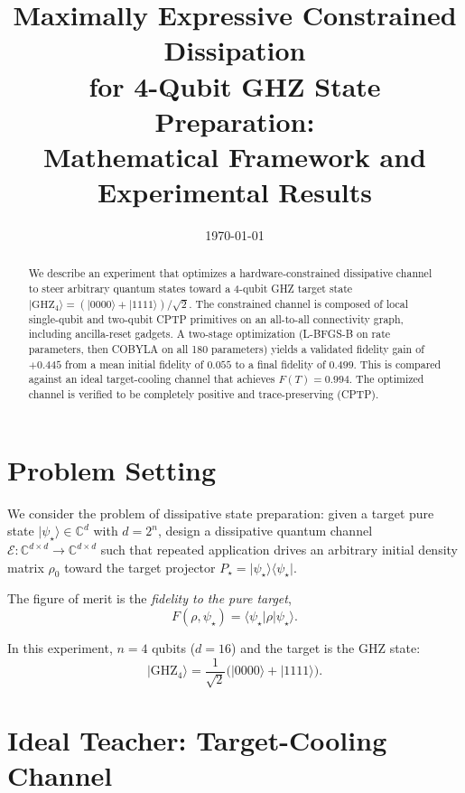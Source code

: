 \documentclass[11pt,a4paper]{article}
\title{Maximally Expressive Constrained Dissipation\\
  for 4-Qubit GHZ State Preparation:\\
  Mathematical Framework and Experimental Results}
\author{}
\date{\today}
\newcommand{\ket}[1]{\lvert #1 \rangle}
\newcommand{\bra}[1]{\langle #1 \rvert}
\newcommand{\C}{\mathbb{C}}
\begin{document}
\maketitle

\begin{abstract}
We describe an experiment that optimizes a hardware-constrained
dissipative channel to steer arbitrary quantum states toward a 4-qubit
GHZ target state $\ket{\mathrm{GHZ}_4} = (\ket{0000}+\ket{1111})/\sqrt{2}$.
The constrained channel is composed of local single-qubit and two-qubit
CPTP primitives on an all-to-all connectivity graph, including ancilla-reset
gadgets.  A two-stage optimization (L-BFGS-B on rate parameters, then
COBYLA on all 180 parameters) yields a validated fidelity gain of
$+0.445$ from a mean initial fidelity of $0.055$ to a final fidelity
of $0.499$.  This is compared against an ideal target-cooling channel
that achieves $F(T)=0.994$.  The optimized channel is verified to be
completely positive and trace-preserving (CPTP).
\end{abstract}

\section{Problem Setting}

We consider the problem of dissipative state preparation:
given a target pure state $\ket{\psi_\star}\in\C^{d}$ with
$d=2^n$, design a dissipative quantum channel
$\mathcal{E}:\C^{d\times d}\to\C^{d\times d}$ such that
repeated application drives an arbitrary initial density matrix
$\rho_0$ toward the target projector
$P_\star = \ket{\psi_\star}\bra{\psi_\star}$.

The figure of merit is the \emph{fidelity to the pure target},
\begin{equation}\label{eq:fidelity}
  F(\rho,\psi_\star) = \bra{\psi_\star}\rho\ket{\psi_\star}.
\end{equation}

In this experiment, $n=4$ qubits ($d=16$) and the target is the
GHZ state:
\begin{equation}
  \ket{\mathrm{GHZ}_4}
  = \frac{1}{\sqrt{2}}\bigl(\ket{0000}+\ket{1111}\bigr).
\end{equation}

\section{Ideal Teacher: Target-Cooling Channel}
\end{document}
